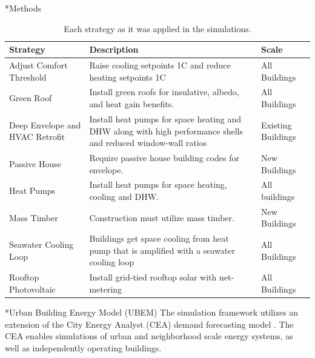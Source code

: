 \documentclass[twocolumn, a4paper,10pt]{article}
\makeatletter
\renewcommand\section{\@startsection{section}{1}{\z@}{3pt}{3pt}{\normalfont\large\bfseries}}
\renewcommand\subsection{\@startsection{subsection}{1}{\z@}{\z@}{\z@}{\normalfont\normalsize\bfseries}}
\renewcommand\subsection{\@startsection{subsection}{1}{\z@}{\z@}{0.1pt}{\normalfont\normalsize\bfseries}}
\makeatother
\begin{document}
\section*{Methods}

\begin{table}[ht]
    \vspace{-5pt}   %
    \caption{Each strategy as it was applied in the simulations.}
    \footnotesize
    \label{tab:strategies}
    \centering
    \begin{tabularx}{\textwidth}{|X|X|X|}
        \hline
        \bf{Strategy} & \bf{Description} & \bf{Scale} \\
        \hline
        Adjust Comfort Threshold & Raise cooling setpoints 1C and reduce heating setpoints 1C & All Buildings \\
        \hline
        Green Roof & Install green roofs for insulative, albedo, and heat gain benefits. & All Buildings \\
        \hline
        Deep Envelope and HVAC Retrofit & Install heat pumps for space heating and DHW along with high performance shells and reduced window-wall ratios & Existing Buildings \\
        \hline
        Passive House & Require passive house building codes for envelope. & New Buildings \\
        \hline
        Heat Pumps & Install heat pumps for space heating, cooling and DHW. & All buildings \\
        \hline
        Mass Timber & Construction must utilize mass timber. & New Buildings \\
        \hline
        Seawater Cooling Loop & Buildings get space cooling from heat pump that is amplified with a seawater cooling loop & All Buildings \\
        \hline
        Rooftop Photovoltaic & Install grid-tied rooftop solar with net-metering & All Buildings \\
        \hline
    \end{tabularx}
    \vspace{-5pt}   %
\end{table}

\subsection*{Urban Building Energy Model (UBEM)}
The simulation framework utilizes an extension of the City Energy Analyst (CEA) demand forecasting model \citep{fonseca_city_2016,the_cea_team_city_2020}. The CEA enables simulations of urban and neighborhood scale energy systems, as well as independently operating buildings. 
\end{document}
